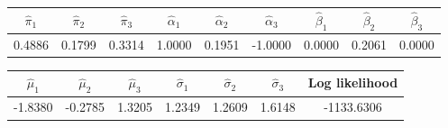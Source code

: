 \begin{tabular}{c |c |c |c |c |c |c |c |c}
$\hat\pi_1$ & $\hat\pi_2$ & $\hat\pi_3$ & $\hat\alpha_1$ & $\hat\alpha_2$ & $\hat\alpha_3$ & $\hat\beta_1$ & $\hat\beta_2$ & $\hat\beta_3$ \\
    \hline
  0.4886 & 0.1799 & 0.3314 & 1.0000 & 0.1951 & -1.0000 & 0.0000 & 0.2061 & 0.0000 \\
\end{tabular}
\begin{tabular}{c |c |c |c |c |c |c}
$\hat\mu_1$ & $\hat\mu_2$ & $\hat\mu_3$ & $\hat\sigma_1$ & $\hat\sigma_2$ & $\hat\sigma_3$ & Log likelihood \\
    \hline
  -1.8380 & -0.2785 & 1.3205 & 1.2349 & 1.2609 & 1.6148 & -1133.6306 \\
\end{tabular}
